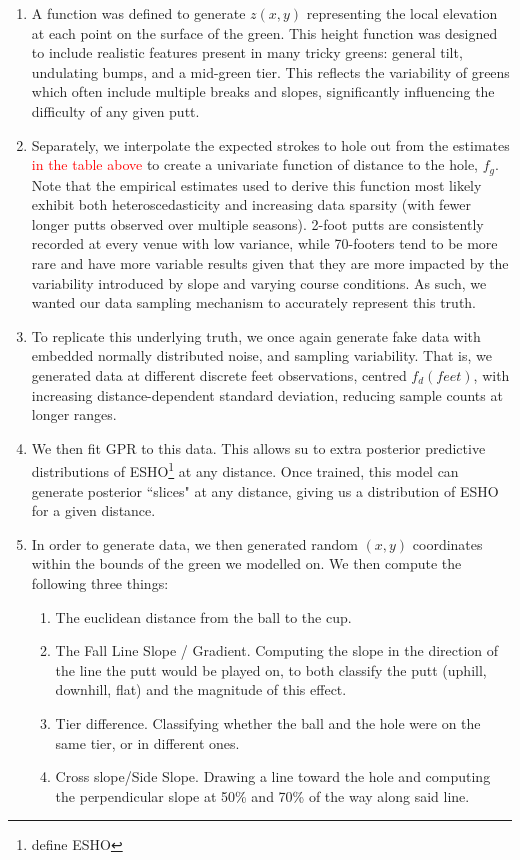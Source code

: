 \documentclass[11pt, letterpaper]{article}
\begin{document}
\begin{enumerate}
    \item A function was defined to generate $z(x,y)$ representing the local elevation at each point on the surface of the green. This height function was designed to include realistic features present in many tricky greens: general tilt, undulating bumps, and a mid-green tier. This reflects the variability of greens which often include multiple breaks and slopes, significantly influencing the difficulty of any given putt.
    \item Separately, we interpolate the expected strokes to hole out from the estimates \textcolor{red}{in the table above} to create a univariate function of distance to the hole, $f_g$. Note that the empirical estimates used to derive this function most likely exhibit both heteroscedasticity and increasing data sparsity (with fewer longer putts observed over multiple seasons). 2-foot putts are consistently recorded at every venue with low variance, while 70-footers tend to be more rare and have more variable results given that they are more impacted by the variability introduced by slope and varying course conditions. As such, we wanted our data sampling mechanism to accurately represent this truth.
    \item To replicate this underlying truth, we once again generate fake data with embedded normally distributed noise, and sampling variability. That is, we generated data at different discrete feet observations, centred $f_d(feet)$, with increasing distance-dependent standard deviation, reducing sample counts at longer ranges. 
    \item We then fit GPR to this data. This allows su to extra posterior predictive distributions of ESHO\footnote{define ESHO} at any distance. Once trained, this model can generate posterior ``slices" at any distance, giving us a distribution of ESHO for a given distance.
    \item In order to generate data, we then generated random $(x,y)$ coordinates within the bounds of the green we modelled on. We then compute the following three things:
    \begin{enumerate}
        \item The euclidean distance from the ball to the cup.
        \item The Fall Line Slope / Gradient. Computing the slope in the direction of the line the putt would be played on, to both classify the putt (uphill, downhill, flat) and the magnitude of this effect.
        \item Tier difference. Classifying whether the ball and the hole were on the same tier, or in different ones.
        \item Cross slope/Side Slope. Drawing a line toward the hole and computing the perpendicular slope at 50\% and 70\% of the way along said line. 
    \end{enumerate}


\end{enumerate}
\end{document}
